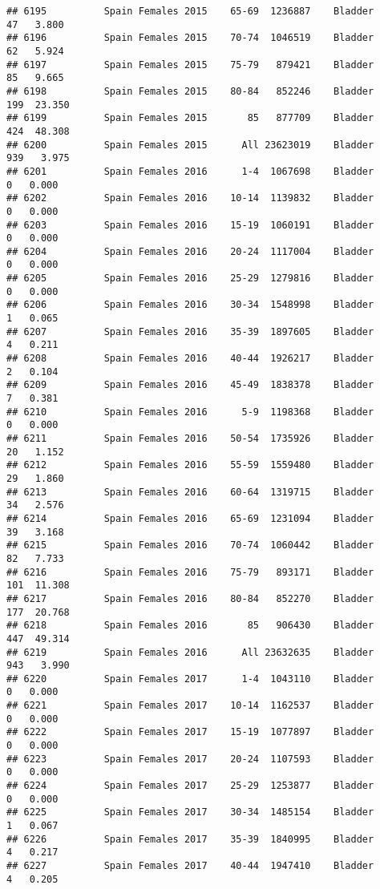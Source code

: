 \documentclass[
]{article}
\begin{document}
\begin{verbatim}
## 6195          Spain Females 2015    65-69  1236887    Bladder     47   3.800
## 6196          Spain Females 2015    70-74  1046519    Bladder     62   5.924
## 6197          Spain Females 2015    75-79   879421    Bladder     85   9.665
## 6198          Spain Females 2015    80-84   852246    Bladder    199  23.350
## 6199          Spain Females 2015       85   877709    Bladder    424  48.308
## 6200          Spain Females 2015      All 23623019    Bladder    939   3.975
## 6201          Spain Females 2016      1-4  1067698    Bladder      0   0.000
## 6202          Spain Females 2016    10-14  1139832    Bladder      0   0.000
## 6203          Spain Females 2016    15-19  1060191    Bladder      0   0.000
## 6204          Spain Females 2016    20-24  1117004    Bladder      0   0.000
## 6205          Spain Females 2016    25-29  1279816    Bladder      0   0.000
## 6206          Spain Females 2016    30-34  1548998    Bladder      1   0.065
## 6207          Spain Females 2016    35-39  1897605    Bladder      4   0.211
## 6208          Spain Females 2016    40-44  1926217    Bladder      2   0.104
## 6209          Spain Females 2016    45-49  1838378    Bladder      7   0.381
## 6210          Spain Females 2016      5-9  1198368    Bladder      0   0.000
## 6211          Spain Females 2016    50-54  1735926    Bladder     20   1.152
## 6212          Spain Females 2016    55-59  1559480    Bladder     29   1.860
## 6213          Spain Females 2016    60-64  1319715    Bladder     34   2.576
## 6214          Spain Females 2016    65-69  1231094    Bladder     39   3.168
## 6215          Spain Females 2016    70-74  1060442    Bladder     82   7.733
## 6216          Spain Females 2016    75-79   893171    Bladder    101  11.308
## 6217          Spain Females 2016    80-84   852270    Bladder    177  20.768
## 6218          Spain Females 2016       85   906430    Bladder    447  49.314
## 6219          Spain Females 2016      All 23632635    Bladder    943   3.990
## 6220          Spain Females 2017      1-4  1043110    Bladder      0   0.000
## 6221          Spain Females 2017    10-14  1162537    Bladder      0   0.000
## 6222          Spain Females 2017    15-19  1077897    Bladder      0   0.000
## 6223          Spain Females 2017    20-24  1107593    Bladder      0   0.000
## 6224          Spain Females 2017    25-29  1253877    Bladder      0   0.000
## 6225          Spain Females 2017    30-34  1485154    Bladder      1   0.067
## 6226          Spain Females 2017    35-39  1840995    Bladder      4   0.217
## 6227          Spain Females 2017    40-44  1947410    Bladder      4   0.205

\end{verbatim}
\end{document}
